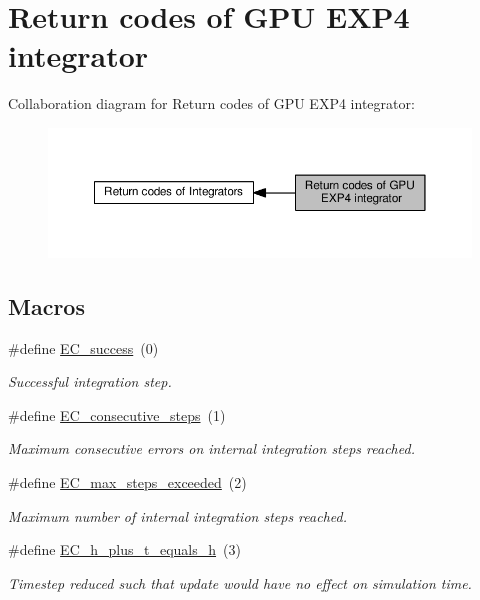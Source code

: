 \hypertarget{group__exprb43cu__ErrCodes}{}\section{Return codes of G\+PU E\+X\+P4 integrator}
\label{group__exprb43cu__ErrCodes}
Collaboration diagram for Return codes of G\+PU E\+X\+P4 integrator\+:\nopagebreak
\begin{figure}[H]
\begin{center}
\leavevmode
\includegraphics[width=350pt]{group__exprb43cu__ErrCodes}
\end{center}
\end{figure}
\subsection*{Macros}
\begin{DoxyCompactItemize}
\item 
\#define \hyperlink{group__exprb43cu__ErrCodes_gabd83bc0f9f475a2189a4db4a08b790ca}{E\+C\+\_\+success}~(0)
\begin{DoxyCompactList}\small\item\em Successful integration step. \end{DoxyCompactList}\item 
\#define \hyperlink{group__exprb43cu__ErrCodes_gae0287841c08f86f5709660fd731615ad}{E\+C\+\_\+consecutive\+\_\+steps}~(1)
\begin{DoxyCompactList}\small\item\em Maximum consecutive errors on internal integration steps reached. \end{DoxyCompactList}\item 
\#define \hyperlink{group__exprb43cu__ErrCodes_ga0f0275d9851ab5c19b79a963d5084df3}{E\+C\+\_\+max\+\_\+steps\+\_\+exceeded}~(2)
\begin{DoxyCompactList}\small\item\em Maximum number of internal integration steps reached. \end{DoxyCompactList}\item 
\#define \hyperlink{group__exprb43cu__ErrCodes_ga9326efd544880e2683c4453365ca2704}{E\+C\+\_\+h\+\_\+plus\+\_\+t\+\_\+equals\+\_\+h}~(3)
\begin{DoxyCompactList}\small\item\em Timestep reduced such that update would have no effect on simulation time. \end{DoxyCompactList}\end{DoxyCompactItemize}


